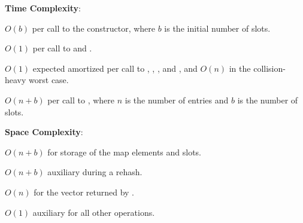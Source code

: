\textbf{Time Complexity}:
\begin{compactitem}
  \item $O(b)$ per call to the constructor, where $b$ is the initial number of slots.
  \item $O(1)$ per call to  and .
  \item $O(1)$ expected amortized per call to , , , and , and $O(n)$ in the collision-heavy worst case.
  \item $O(n + b)$ per call to , where $n$ is the number of entries and $b$ is the number of slots.
\end{compactitem}

\textbf{Space Complexity}:
\begin{compactitem}
  \item $O(n + b)$ for storage of the map elements and slots.
  \item $O(n + b)$ auxiliary during a rehash.
  \item $O(n)$ for the vector returned by .
  \item $O(1)$ auxiliary for all other operations.
\end{compactitem}

